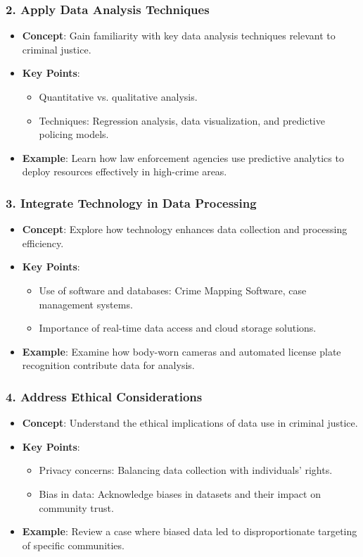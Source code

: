 \documentclass[aspectratio=169]{beamer}
\begin{document}
\begin{frame}[fragile]
    \frametitle{2. Apply Data Analysis Techniques}
    \begin{itemize}
        \item \textbf{Concept}: Gain familiarity with key data analysis techniques relevant to criminal justice.
        \item \textbf{Key Points}:
        \begin{itemize}
            \item Quantitative vs. qualitative analysis.
            \item Techniques: Regression analysis, data visualization, and predictive policing models.
        \end{itemize}
        \item \textbf{Example}: Learn how law enforcement agencies use predictive analytics to deploy resources effectively in high-crime areas.
    \end{itemize}
\end{frame}

\begin{frame}[fragile]
    \frametitle{3. Integrate Technology in Data Processing}
    \begin{itemize}
        \item \textbf{Concept}: Explore how technology enhances data collection and processing efficiency.
        \item \textbf{Key Points}:
        \begin{itemize}
            \item Use of software and databases: Crime Mapping Software, case management systems.
            \item Importance of real-time data access and cloud storage solutions.
        \end{itemize}
        \item \textbf{Example}: Examine how body-worn cameras and automated license plate recognition contribute data for analysis.
    \end{itemize}
\end{frame}

\begin{frame}[fragile]
    \frametitle{4. Address Ethical Considerations}
    \begin{itemize}
        \item \textbf{Concept}: Understand the ethical implications of data use in criminal justice.
        \item \textbf{Key Points}:
        \begin{itemize}
            \item Privacy concerns: Balancing data collection with individuals' rights.
            \item Bias in data: Acknowledge biases in datasets and their impact on community trust.
        \end{itemize}
        \item \textbf{Example}: Review a case where biased data led to disproportionate targeting of specific communities.
    \end{itemize}
\end{frame}
\end{document}
